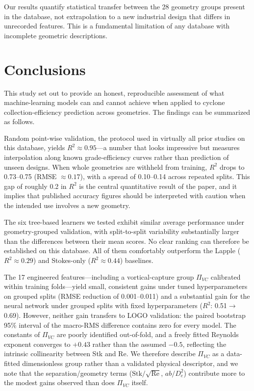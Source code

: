 \documentclass[12pt]{article}
\newcommand{\Stk}{\mathrm{Stk}}
\newcommand{\Rey}{\mathrm{Re}}
\newcommand{\PiVC}{\Pi_{VC}}
\begin{document}
Our results quantify statistical transfer between the 28 geometry groups present in the database, not extrapolation to a new industrial design that differs in unrecorded features. This is a fundamental limitation of any database with incomplete geometric descriptions.

\section{Conclusions}

This study set out to provide an honest, reproducible assessment of what machine-learning models can and cannot achieve when applied to cyclone collection-efficiency prediction across geometries. The findings can be summarized as follows.

Random point-wise validation, the protocol used in virtually all prior studies on this database, yields $R^2 \approx 0.95$---a number that looks impressive but measures interpolation along known grade-efficiency curves rather than prediction of unseen designs. When whole geometries are withheld from training, $R^2$ drops to 0.73--0.75 (RMSE $\approx 0.17$), with a spread of 0.10--0.14 across repeated splits. This gap of roughly 0.2 in $R^2$ is the central quantitative result of the paper, and it implies that published accuracy figures should be interpreted with caution when the intended use involves a new geometry.

The six tree-based learners we tested exhibit similar average performance under geometry-grouped validation, with split-to-split variability substantially larger than the differences between their mean scores. No clear ranking can therefore be established on this database. All of them comfortably outperform the Lapple ($R^2 \approx 0.29$) and Stokes-only ($R^2 \approx 0.44$) baselines.

The 17 engineered features---including a vortical-capture group $\PiVC$ calibrated within training folds---yield small, consistent gains under tuned hyperparameters on grouped splits (RMSE reduction of 0.001--0.011) and a substantial gain for the neural network under grouped splits with fixed hyperparameters ($R^2$: 0.51$\to$0.69). However, neither gain transfers to LOGO validation: the paired bootstrap 95\% interval of the macro-RMS difference contains zero for every model. The constants of $\PiVC$ are poorly identified out-of-fold, and a freely fitted Reynolds exponent converges to $+0.43$ rather than the assumed $-0.5$, reflecting the intrinsic collinearity between Stk and Re. We therefore describe $\PiVC$ as a data-fitted dimensionless group rather than a validated physical descriptor, and we note that the separation/geometry terms ($\Stk/\sqrt{\Rey}$, $ab/D_e^2$) contribute more to the modest gains observed than does $\PiVC$ itself.
\end{document}
